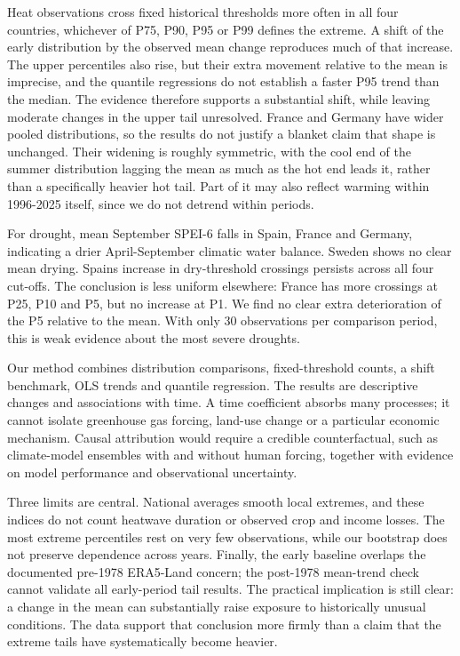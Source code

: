 \documentclass[
  10pt,
]{article}
\begin{document}
Heat observations cross fixed historical thresholds more often in all
four countries, whichever of P75, P90, P95 or P99 defines the extreme. A
shift of the early distribution by the observed mean change reproduces
much of that increase. The upper percentiles also rise, but their extra
movement relative to the mean is imprecise, and the quantile
regressions do not establish a faster P95 trend than the median. The
evidence therefore supports a substantial shift, while leaving moderate
changes in the upper tail unresolved. France and Germany have wider
pooled distributions, so the results do not justify a blanket claim that
shape is unchanged. Their widening is roughly symmetric, with the cool
end of the summer distribution lagging the mean as much as the hot end
leads it, rather than a specifically heavier hot tail. Part of it may
also reflect warming within 1996-2025 itself, since we do not detrend
within periods.

For drought, mean September SPEI-6 falls in Spain, France and Germany,
indicating a drier April-September climatic water balance. Sweden shows
no clear mean drying. Spain\textquotesingle s increase in dry-threshold
crossings persists across all four cut-offs. The conclusion is less
uniform elsewhere: France has more crossings at P25, P10 and P5, but no
increase at P1. We find no clear extra deterioration of the P5 relative
to the mean. With only 30 observations per comparison period, this is
weak evidence about the most severe droughts.

Our method combines distribution comparisons, fixed-threshold counts, a
shift benchmark, OLS trends and quantile regression. The results are
descriptive changes and associations with time. A time coefficient
absorbs many processes; it cannot isolate greenhouse gas forcing,
land-use change or a particular economic mechanism. Causal attribution
would require a credible counterfactual, such as climate-model ensembles
with and without human forcing, together with evidence on model
performance and observational uncertainty.

Three limits are central. National averages smooth local extremes, and
these indices do not count heatwave duration or observed crop and income
losses. The most extreme percentiles rest on very few observations,
while our bootstrap does not preserve dependence across years. Finally,
the early baseline overlaps the documented pre-1978 ERA5-Land concern;
the post-1978 mean-trend check cannot validate all early-period tail
results. The practical implication is still clear: a change in the mean
can substantially raise exposure to historically unusual conditions. The
data support that conclusion more firmly than a claim that the extreme
tails have systematically become heavier.
\end{document}
